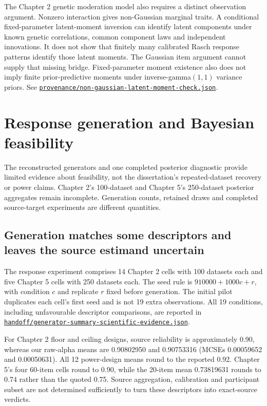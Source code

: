 \documentclass[11pt]{article}
\newcommand{\file}[1]{\href{https://github.com/alectionary/vibe-math/blob/master/formalization/schwabe-psychometric-genetics/#1}{\nolinkurl{#1}}}
\begin{document}
The Chapter 2 genetic moderation model also requires a distinct observation argument. Nonzero interaction gives non-Gaussian marginal traits. A conditional fixed-parameter latent-moment inversion can identify latent components under known genetic correlations, common component laws and independent innovations. It does not show that finitely many calibrated Rasch response patterns identify those latent moments. The Gaussian item argument cannot supply that missing bridge. Fixed-parameter moment existence also does not imply finite prior-predictive moments under inverse-gamma$(1,1)$ variance priors. See \file{provenance/non-gaussian-latent-moment-check.json}.

\section{Response generation and Bayesian feasibility}\label{sec:bayes}
The reconstructed generators and one completed posterior diagnostic provide limited evidence about feasibility, not the dissertation's repeated-dataset recovery or power claims. Chapter 2's 100-dataset and Chapter 5's 250-dataset posterior aggregates remain incomplete. Generation counts, retained draws and completed source-target experiments are different quantities.

\subsection{Generation matches some descriptors and leaves the source estimand uncertain}
The response experiment comprises 14 Chapter 2 cells with 100 datasets each and five Chapter 5 cells with 250 datasets each. The seed rule is $910000+1000c+r$, with condition $c$ and replicate $r$ fixed before generation. The initial pilot duplicates each cell's first seed and is not 19 extra observations. All 19 conditions, including unfavourable descriptor comparisons, are reported in \file{handoff/generator-summary-scientific-evidence.json}.

For Chapter 2 floor and ceiling designs, source reliability is approximately 0.90, whereas our raw-alpha means are 0.90802950 and 0.90753316 (MCSEs 0.00059652 and 0.00050631). All 12 power-design means round to the reported 0.92. Chapter 5's four 60-item cells round to 0.90, while the 20-item mean 0.73819631 rounds to 0.74 rather than the quoted 0.75. Source aggregation, calibration and participant subset are not determined sufficiently to turn these descriptors into exact-source verdicts.
\end{document}
